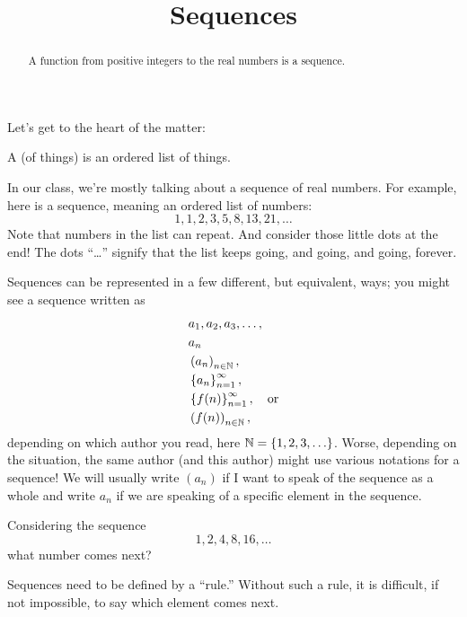 \documentclass{ximera}
\title[Dig-In:]{Sequences}
\begin{document}
\begin{abstract}
  A function from positive integers to the real numbers is a sequence.
\end{abstract}
\maketitle


Let's get to the heart of the matter:

\begin{definition}
  A  (of things) is an ordered list of things.
\end{definition}

In our class, we're mostly talking about a sequence of real numbers.
For example, here is a sequence, meaning an ordered list of numbers:
\[
1,1, 2, 3, 5, 8, 13, 21, \ldots
\]
Note that numbers in the list can repeat.  And consider those little
dots at the end!  The dots ``\ldots'' signify that the list keeps
going, and going, and going, forever.

Sequences can be represented in a few different, but equivalent, ways;
you might see a sequence written as
\begin{align*}
  & a_1, a_2,  a_3, \ldots, \\
  & a_n \\
  & \left(a_n\right)_{n \in \mathbb N}, \\
  & \left\{a_n\right\}_{n=1}^\infty, \\
  & \left\{f(n)\right\}_{n=1}^\infty, \quad \text{or} \\
  & \left(f(n)\right)_{n \in \mathbb N},
\end{align*}
depending on which author you read, here $\mathbb N=\{1,2,3,\ldots\}$.  Worse, depending on the
situation, the same author (and this author) might use various
notations for a sequence!  We will usually write $(a_n)$ if I want to
speak of the sequence as a whole and write $a_n$ if we are speaking of
a specific element in the sequence.


\begin{question}
  Considering the sequence
  \[
  1, 2, 4, 8, 16, \dots
  \]
  what number comes next?
  \begin{multipleChoice}
  \end{multipleChoice}
  \begin{feedback}
    Sequences need to be defined by a ``rule.'' Without such a rule,
    it is difficult, if not impossible, to say which element comes
    next.
  \end{feedback}
\end{question}
\end{document}
